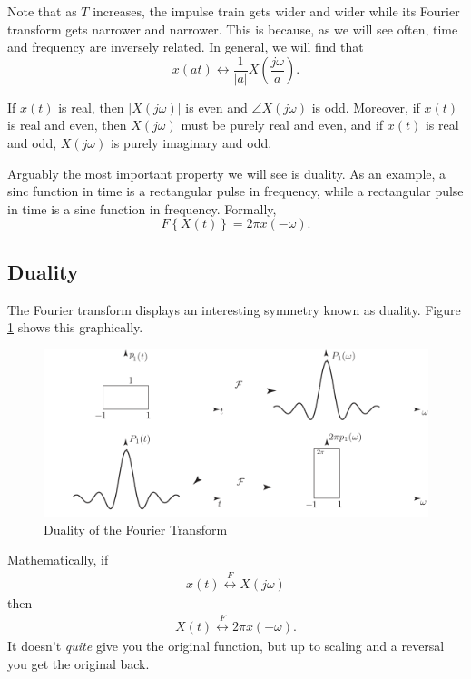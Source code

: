 Note that as $T$ increases, the impulse train gets wider
and wider while its Fourier transform gets narrower and
narrower. This is because, as we will see often, time and
frequency are inversely related. In general, we will find
that
\begin{equation}
    x(at) \leftrightarrow \frac{1}{|a|}X(\frac{j\omega}{a}).
\end{equation}

If $x(t)$ is real, then $|X(j\omega)|$ is even and
$\angle X(j\omega)$ is odd. Moreover, if $x(t)$ is real
and even, then $X(j\omega)$ must be purely real and even,
and if $x(t)$ is real and odd, $X(j\omega)$ is purely
imaginary and odd.

Arguably the most important property we will see is duality.
As an example, a sinc function in time is a rectangular pulse
in frequency, while a rectangular pulse in time is a sinc
function in frequency. Formally,
\begin{equation}
    F\left\{ X(t) \right\} = 2\pi x(-\omega).
\end{equation}

\subsection{Duality}

The Fourier transform displays an interesting symmetry known as duality. 
Figure \ref{fig:duality} shows this graphically. 
\begin{figure}
    \begin{center}
        \includegraphics{images/duality.png}
    \end{center}
    \caption{Duality of the Fourier Transform}
    \label{fig:duality}
\end{figure}
Mathematically, if 
\begin{align}
    x(t) \overset{F}{\leftrightarrow} X(j\omega)
\end{align}
then 
\begin{align}
    X(t) \overset{F}{\leftrightarrow} 2\pi x(-\omega).
\end{align}
It doesn't \emph{quite} give you the original function, 
but up to scaling and a reversal you get the original back. 

